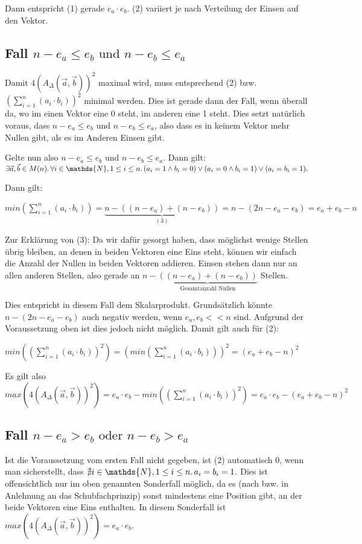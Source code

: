 \documentclass{article}
\newcommand{\sumN}[2]{\ensuremath{\sum\limits_{#1}^{#2}}}
\newcommand{\inN}[1]{\ensuremath{#1 \in \mathds{N}}}
\newcommand{\faExp}[2]{\ensuremath{\forall #1 \ldotp #2}}
\begin{document}
Dann entspricht (1) gerade $e_a \cdot e_b$. (2) variiert je nach Verteilung der Einsen auf den Vektor.

\subsection{Fall $n-e_a \leq e_b \text{ und } n-e_b \leq e_a$}

Damit $4(A_\Delta(\vec a,\vec b))^2$ maximal wird, muss entsprechend (2) bzw. $(\sumN{i=1}{n}(a_i \cdot b_i))^2$ minimal werden. Dies ist gerade dann der Fall, wenn überall da, wo im einen Vektor eine 0 steht, im anderen eine 1 steht. Dies setzt natürlich voraus, dass $n-e_a \leq e_b \text{ und } n-e_b \leq e_a$, also dass es in keinem Vektor mehr Nullen gibt, als es im Anderen Einsen gibt. 

Gelte nun also $n-e_a \leq e_b \text{ und } n-e_b \leq e_a$. Dann gilt: $\exists \vec a, \vec b \in M(n) \ldotp \faExp{\inN{i}, 1 \leq i \leq n}{(a_i = 1 \land b_i = 0) \lor (a_i = 0 \land b_i = 1) \lor (a_i = b_i = 1) \ldotp}$

Dann gilt:

$min(\sumN{i=1}{n}(a_i \cdot b_i)) = \underbrace{n - ((n-e_a)+(n-e_b))}_{(3)} = n - (2n-e_a-e_b) = e_a + e_b - n$

Zur Erklärung von (3): Da wir dafür gesorgt haben, dass möglichst wenige Stellen übrig bleiben, an denen in beiden Vektoren eine Eins steht, können wir einfach die Anzahl der Nullen in beiden Vektoren addieren. Einsen stehen dann nur an allen anderen Stellen, also gerade an $n - \underbrace{ ((n-e_a)+(n-e_b))}_{\text{Gesamtanzahl Nullen}}$ Stellen. 

Dies entspricht in diesem Fall dem Skalarprodukt. Grundsätzlich könnte $n - (2n-e_a-e_b)$ auch negativ werden, wenn $e_a, e_b << n$ sind. Aufgrund der Voraussetzung oben ist dies jedoch nicht möglich. Damit gilt auch für (2):

$min((\sumN{i=1}{n}(a_i \cdot b_i))^2) = (min(\sumN{i=1}{n}(a_i \cdot b_i)))^2 = (e_a + e_b - n)^2$

Es gilt also $max(4(A_\Delta(\vec a,\vec b))^2) = e_a \cdot e_b - min((\sumN{i=1}{n}(a_i \cdot b_i))^2) = e_a \cdot e_b - (e_a + e_b - n)^2$

\subsection{Fall $n-e_a > e_b \text{ oder } n-e_b > e_a$}

Ist die Voraussetzung vom ersten Fall nicht gegeben, ist (2) automatisch 0, wenn man sicherstellt, dass $\nexists \inN{i}, 1 \leq i \leq n \ldotp a_i = b_i = 1$. Dies ist offensichtlich nur im oben genannten Sonderfall möglich, da es (nach bzw. in Anlehnung an das Schubfachprinzip) sonst mindestens eine Position gibt, an der beide Vektoren eine Eins enthalten. In diesem Sonderfall ist $max(4(A_\Delta(\vec a,\vec b))^2) = e_a \cdot e_b$.
\end{document}
